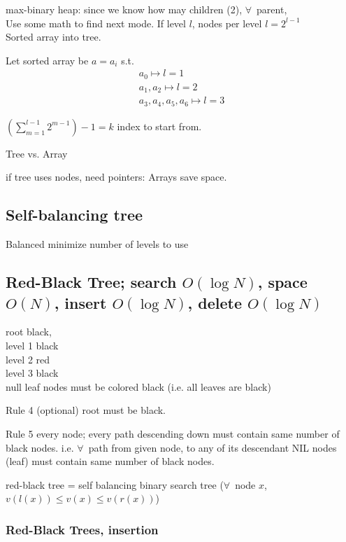 \documentclass[10pt]{amsart}
\begin{document}
\begin{multicols*}{2}
max-binary heap: since we know how may children (2), $\forall \, $ parent, \\
Use some math to find next mode. If level $l$, nodes per level $l= 2^{l-1}$ \\
Sorted array into tree.

Let sorted array be $a=a_i$ s.t. 
\[
\begin{gathered} 
	a_0 \mapsto l = 1\\ 
a_1, a_2 \mapsto l = 2 \\ 
a_3, a_4, a_5, a_6 \mapsto l = 3 
\end{gathered} 
\]

$\left(\sum_{m=1}^{l-1} 2^{m-1} \right) - 1 = k$ index to start from. 

Tree vs. Array

if tree uses nodes, need pointers: Arrays save space. 

\subsection{Self-balancing tree}

Balanced minimize number of levels to use

\subsection{Red-Black Tree; search $O(\log{N})$, space $O(N)$, insert $O(\log{N})$, delete $O(\log{N})$ }

root black, \\
level 1 black \\
level 2 red \\
level 3 black \\

null leaf nodes must be colored black (i.e. all leaves are black)

Rule 4 (optional) root must be black.

Rule 5 every node; every path descending down must contain same number of black nodes. i.e. $\forall\, $ path from given node, to any of its descendant NIL nodes (leaf) must contain same number of black nodes. 

red-black tree = self balancing binary search tree ($\forall \, $ node $x$, $v(l(x)) \leq v(x) \leq v(r(x))$)

\subsubsection{Red-Black Trees, insertion}


\end{multicols*}
\end{document}
